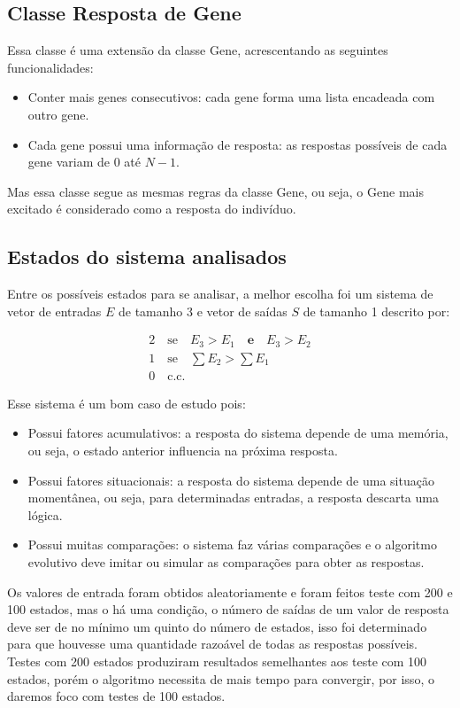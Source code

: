 \subsection{Classe Resposta de Gene}

Essa classe é uma extensão da classe Gene, acrescentando as seguintes funcionalidades:
\begin{itemize}
    \item Conter mais genes consecutivos: cada gene forma uma lista encadeada com outro gene.
    \item Cada gene possui uma informação de resposta: as respostas possíveis de cada gene variam de 0 até $N-1$.
\end{itemize}

Mas essa classe segue as mesmas regras da classe Gene, ou seja, o Gene mais excitado é considerado como a resposta do indivíduo.

\subsection{Estados do sistema analisados}

Entre os possíveis estados para se analisar, a melhor escolha foi um sistema de vetor de entradas $E$ de tamanho 3 e vetor de saídas $S$ de tamanho 1 descrito por:

\begin{gather*}
    2 \quad \mathrm{se} \quad E_3 > E_1 \quad \mathbf{e} \quad E_3 > E_2 \\
    1 \quad \mathrm{se} \quad \sum E_2 > \sum E_1 \\
    0 \quad \mathrm{c.c.}
\end{gather*}

Esse sistema é um bom caso de estudo pois:

\begin{itemize}
    \item Possui fatores acumulativos: a resposta do sistema depende de uma memória, ou seja, o estado anterior influencia na próxima resposta.
    \item Possui fatores situacionais: a resposta do sistema depende de uma situação momentânea, ou seja, para determinadas entradas, a resposta descarta uma lógica.
    \item Possui muitas comparações: o sistema faz várias comparações e o algoritmo evolutivo deve imitar ou simular as comparações para obter as respostas.
\end{itemize}

Os valores de entrada foram obtidos aleatoriamente e foram feitos teste com 200 e 100 estados, mas o há uma condição, o número de saídas de um valor de resposta deve ser de no mínimo um quinto do número de estados, isso foi determinado para que houvesse uma quantidade razoável de todas as respostas possíveis. Testes com 200 estados produziram resultados semelhantes aos teste com 100 estados, porém o algoritmo necessita de mais tempo para convergir, por isso, o daremos foco com testes de 100 estados.

